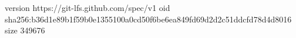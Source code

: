 version https://git-lfs.github.com/spec/v1
oid sha256:b36d1e89b1f59b0e1355100a0cd50f6be6ea849fd69d2d2c51ddcfd78d4d8016
size 349676
